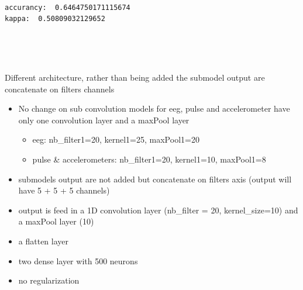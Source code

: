 \documentclass[11pt]{article}
\providecommand{\tightlist}{%
      \setlength{\itemsep}{0pt}\setlength{\parskip}{0pt}}
\begin{document}
    \begin{center}
    \end{center}
    { \hspace*{\fill} \\}
    
    \begin{Verbatim}[commandchars=\\\{\}]
accurancy:  0.6464750171115674
kappa:  0.50809032129652

    \end{Verbatim}

    \begin{center}
    \end{center}
    { \hspace*{\fill} \\}
    
    \begin{center}
    \end{center}
    { \hspace*{\fill} \\}
    
    Different architecture, rather than being added the submodel output are
concatenate on filters channels

\begin{itemize}
\tightlist
\item
  No change on sub convolution models for eeg, pulse and accelerometer
  have only one convolution layer and a maxPool layer

  \begin{itemize}
  \tightlist
  \item
    eeg: nb\_filter1=20, kernel1=25, maxPool1=20
  \item
    pulse \& accelerometers: nb\_filter1=20, kernel1=10, maxPool1=8
  \end{itemize}
\end{itemize}

\begin{itemize}
\tightlist
\item
  submodels output are not added but concatenate on filters axis (output
  will have 5 + 5 + 5 channels) 
\item
  output is feed in a 1D convolution layer (nb\_filter = 20,
  kernel\_size=10) and a maxPool layer (10)
\item
  a flatten layer
\item
  two dense layer with 500 neurons
\item
  no regularization 
\end{itemize}
\end{document}
